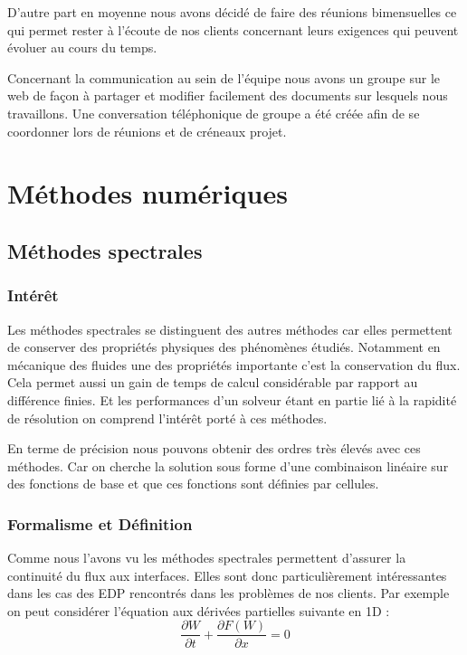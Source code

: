 \documentclass[a4paper,12pt]{report}
\theoremstyle{break}
\begin{document}
    D’autre part en moyenne nous avons décidé de faire des réunions bimensuelles ce qui permet rester à l’écoute de nos clients concernant leurs exigences qui peuvent évoluer au cours du temps. 
    
    Concernant la communication au sein de l’équipe nous avons un groupe sur le web de façon à partager et modifier facilement des documents sur lesquels nous travaillons. Une conversation téléphonique de groupe a été créée afin de se coordonner lors de réunions et de créneaux projet. 

\part{Méthodes numériques}
\chapter{Méthodes spectrales}
\section{Intérêt}

Les méthodes spectrales se distinguent des autres méthodes car elles permettent de conserver des propriétés physiques des phénomènes étudiés. Notamment en mécanique des fluides une des propriétés importante c'est la conservation du flux.
Cela permet aussi un gain de temps de calcul considérable par rapport au différence finies. Et les performances d'un solveur étant en partie lié à la rapidité de résolution on comprend l'intérêt porté à ces méthodes. 

En terme de précision nous pouvons obtenir des ordres très élevés avec ces méthodes. Car on cherche la solution sous forme d'une combinaison linéaire sur des fonctions de base et que ces fonctions sont définies par cellules. 

\section{Formalisme et Définition}

Comme nous l'avons vu les méthodes spectrales permettent d'assurer la continuité du flux aux interfaces. Elles sont donc particulièrement intéressantes dans les cas des EDP rencontrés dans les problèmes de nos clients. Par exemple on peut considérer l'équation aux dérivées partielles suivante en 1D : 
\begin{equation}
\frac{\partial W}{\partial t}+\frac{\partial F(W)}{\partial x}=0 \nonumber
\end{equation}
\end{document}
